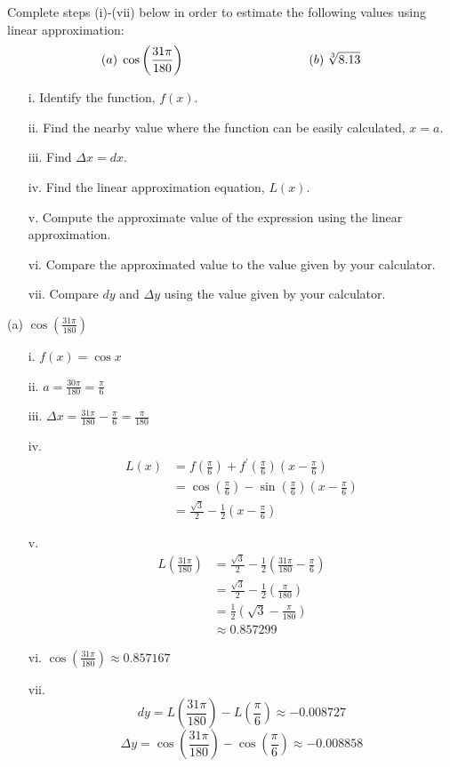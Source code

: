 \documentclass[handout,nooutcomes]{ximera}
\begin{document}
\begin{problem}
Complete steps (i)-(vii) below in order to estimate the following values using linear approximation:
$$ (a) \; \cos \left( \frac{31 \pi}{180} \right)	\hskip 100pt	(b) \; \sqrt[3]{8.13} $$
	\begin{enumerate}
	\item[i.]  Identify the function, $f(x)$.
	\item[ii.]  Find the nearby value where the function can be easily calculated, $x=a$.
	\item[iii.]  Find $\Delta x=dx$.
	\item[iv.]  Find the linear approximation equation, $L(x)$.  
	\item[v.]  Compute the approximate value of the expression using the linear approximation.
	\item[vi.]  Compare the approximated value to the value given by your calculator.
	\item[vii.]  Compare $dy$ and $\Delta y$ using the value given by your calculator.
	\end{enumerate}
		\begin{freeResponse}
		(a)  $ \cos \left( \frac{31 \pi}{180} \right)$
			\begin{enumerate}
			\item[i.]  $f(x) = \cos x$
			\item[ii.]  $a = \frac{30 \pi}{180} = \frac{\pi}{6}$
			\item[iii.]  $\Delta x = \frac{31 \pi}{180} - \frac{\pi}{6} = \frac{\pi}{180}$
			\item[iv.]  
				\begin{align*}
				L(x) &= f\left( \frac{\pi}{6} \right) + f^\prime \left(\frac{\pi}{6} \right) \left( x - \frac{\pi}{6} \right) \\
				&=  \cos \left( \frac{\pi}{6} \right) - \sin \left(\frac{\pi}{6} \right) \left( x - \frac{\pi}{6} \right) \\
				&=  \frac{\sqrt{3}}{2} - \frac{1}{2} \left( x - \frac{\pi}{6} \right) 
				\end{align*}
			\item[v.]   
				\begin{align*}
				L \left( \frac{31 \pi}{180} \right) &= \frac{\sqrt{3}}{2} - \frac{1}{2} \left( \frac{31 \pi}{180} - \frac{\pi}{6} \right) \\
				&=  \frac{\sqrt{3}}{2} - \frac{1}{2} \left( \frac{\pi}{180} \right) \\
				&= \frac{1}{2} \left( \sqrt{3} - \frac{\pi}{180} \right) \\
				&\approx 0.857299
				\end{align*}
			\item[vi.]  $\cos \left( \frac{31 \pi}{180} \right) \approx 0.857167$
			\item[vii.]  
			$$ dy = L\left( \frac{31\pi}{180} \right) - L \left( \frac{\pi}{6} \right) \approx -0.008727 $$
			$$ \Delta y = \cos \left( \frac{31 \pi}{180} \right) - \cos \left( \frac{\pi}{6} \right) \approx -0.008858 $$
			\end{enumerate}
			

\end{freeResponse}
\end{problem}
\end{document}
